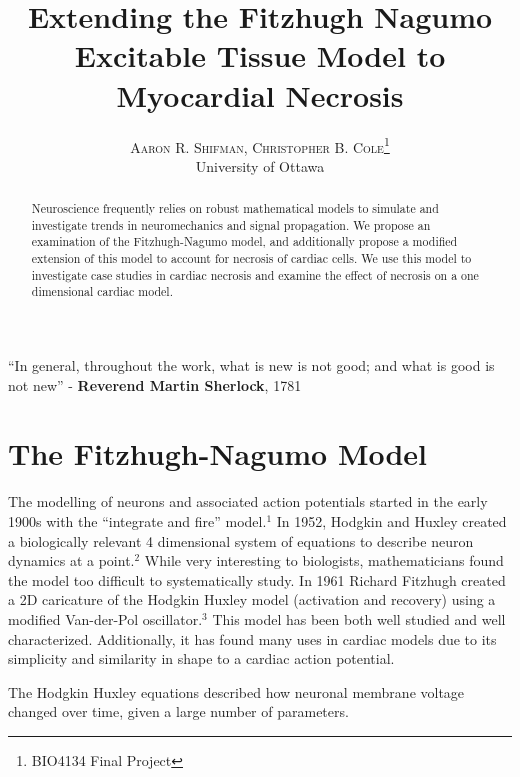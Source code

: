 \documentclass[11pt]{report}
\title{\vspace{-15mm}\fontsize{24pt}{10pt}\selectfont\textbf{Extending the Fitzhugh Nagumo Excitable Tissue
Model to Myocardial Necrosis}} %
\author{
\large
\textsc{Aaron R. Shifman, Christopher B. Cole}\thanks{BIO4134 Final Project}\\[2mm] %
\normalsize University of Ottawa \\ %
\vspace{-5mm}
}
\date{}
\newenvironment{dedication}
  {\clearpage           %
   \thispagestyle{empty}%
   \vspace*{\stretch{1}}%
   \itshape             %
   \raggedleft          %
  }
  {\par %
   \vspace{\stretch{3}} %
   \clearpage           %
  }
\begin{document}
\maketitle %

\thispagestyle{fancy} %


\begin{dedication}
``In general, throughout the work, what is new is not good; and what is good is not new'' - \textbf{Reverend Martin Sherlock}, 1781 
\end{dedication}

\begin{abstract}

Neuroscience frequently relies on robust mathematical models to simulate and investigate trends in neuromechanics and signal propagation. We propose an examination of the Fitzhugh-Nagumo model, and additionally propose a modified extension of this model to account for necrosis of cardiac cells. We use this model to investigate case studies in cardiac necrosis and examine the effect of necrosis on a one dimensional cardiac model. 
\end{abstract}


\newpage

\tableofcontents

\newpage

\listoffigures

\newpage

\chapter{The Fitzhugh-Nagumo Model}

The modelling of neurons and associated action potentials started in the early 1900s with the ``integrate and fire'' model.$^1$ In 1952, Hodgkin and Huxley created a biologically relevant 4 dimensional system of equations to describe neuron dynamics at a point.$^2$ While very interesting to biologists, mathematicians found the model too difficult to systematically study. In 1961 Richard Fitzhugh created a 2D caricature of the Hodgkin Huxley model (activation and recovery) using a modified Van-der-Pol oscillator.$^3$ This model has been both well studied and well characterized. Additionally, it has found many uses in cardiac models due to its simplicity and similarity in shape to a cardiac action potential. 

The Hodgkin Huxley equations described how neuronal membrane voltage changed over time, given a large number of parameters. 
\end{document}

